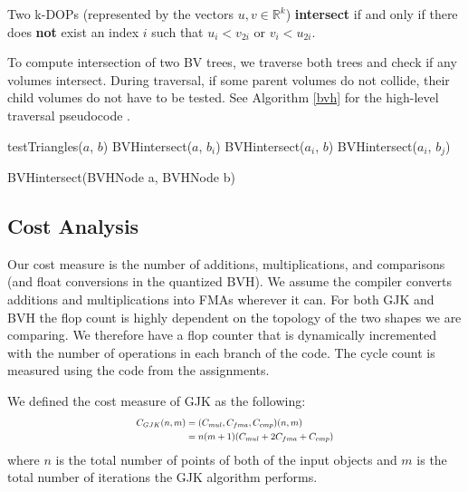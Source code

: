 \documentclass[twocolumn]{article}
\begin{document}
Two k-DOPs (represented by the vectors $u,v \in \mathbb{R}^k$) \textbf{intersect }if and only if there does \textbf{not }exist an index $i$ such that $u_i < v_{2i}$ or $v_i < u_{2i}$.

To compute intersection of two BV trees, we traverse both trees and check if any volumes intersect. 
During traversal, if some parent volumes do not collide, their child volumes do not have to be tested. 
See Algorithm \ref{bvh} for the high-level traversal pseudocode \cite{simdop}.

\begin{algorithm}
\DontPrintSemicolon
 {
 	testTriangles($a$, $b$)
 }
 {
 	{
 		{
 			BVHintersect($a$, $b_i$)
 		}
 	}
 }
 {
 	{
 		{
 			BVHintersect($a_i$, $b$)
 		}
 	}
 }
 \Else
 {
 	{
 		{
 			BVHintersect($a_i$, $b_j$)
 		}
 	}
 }
\caption{BVHintersect(BVHNode  a, BVHNode b)}
\label{bvh}
\end{algorithm}

\subsection{Cost Analysis}
Our cost measure is the number of additions, multiplications, and comparisons (and float conversions in the quantized BVH). 
We assume the compiler converts additions and multiplications into FMAs wherever it can. 
For both GJK and BVH the flop count is highly dependent on the topology of the two shapes we are comparing. 
We therefore have a flop counter that is dynamically incremented with the number of operations in each branch of the code. 
The cycle count is measured using the code from the assignments.

We defined the cost measure of GJK as the following:
\begin{equation*}
\resizebox{5.5cm}{!}{$
\begin{split}
C_{GJK}(n,m) & = (C_{mul}, C_{fma}, C_{cmp})(n,m) \\
& = n(m + 1)(C_{mul} + 2C_{fma} + C_{cmp})
\end{split}
$}
\end{equation*}
where $n$ is the total number of points of both of the input objects and  $m$ is the total number of iterations the GJK algorithm performs. 
\end{document}
